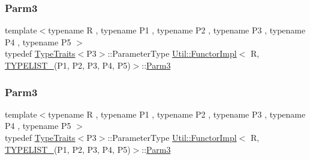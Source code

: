 \mbox{\label{classUtil_1_1FunctorImpl_3_01R_00_01TYPELIST__5_07P1_00_01P2_00_01P3_00_01P4_00_01P5_08_4_a5ad1ce88b66a6e09b4a462f27ebeb665}} 
\subsubsection{\texorpdfstring{Parm3}{Parm3}\hspace{0.1cm}{\footnotesize\ttfamily [1/3]}}
{\footnotesize\ttfamily template$<$typename R , typename P1 , typename P2 , typename P3 , typename P4 , typename P5 $>$ \\
typedef \mbox{\hyperlink{classUtil_1_1TypeTraits}{Type\+Traits}}$<$P3$>$\+::Parameter\+Type \mbox{\hyperlink{classUtil_1_1FunctorImpl}{Util\+::\+Functor\+Impl}}$<$ R, \mbox{\hyperlink{adat__devel__install_2include_2adat_2typelist_8h_aad5d9b3c82c8503c85c625acd41c0a2f}{T\+Y\+P\+E\+L\+I\+S\+T\+\_}}(P1, P2, P3, P4, P5)$>$\+::\mbox{\hyperlink{structUtil_1_1Private_1_1FunctorImplBase_a052148e627fd4caecbcffdbdf1033dbb}{Parm3}}}

\mbox{\label{classUtil_1_1FunctorImpl_3_01R_00_01TYPELIST__5_07P1_00_01P2_00_01P3_00_01P4_00_01P5_08_4_a5ad1ce88b66a6e09b4a462f27ebeb665}} 
\subsubsection{\texorpdfstring{Parm3}{Parm3}\hspace{0.1cm}{\footnotesize\ttfamily [2/3]}}
{\footnotesize\ttfamily template$<$typename R , typename P1 , typename P2 , typename P3 , typename P4 , typename P5 $>$ \\
typedef \mbox{\hyperlink{classUtil_1_1TypeTraits}{Type\+Traits}}$<$P3$>$\+::Parameter\+Type \mbox{\hyperlink{classUtil_1_1FunctorImpl}{Util\+::\+Functor\+Impl}}$<$ R, \mbox{\hyperlink{adat__devel__install_2include_2adat_2typelist_8h_aad5d9b3c82c8503c85c625acd41c0a2f}{T\+Y\+P\+E\+L\+I\+S\+T\+\_}}(P1, P2, P3, P4, P5)$>$\+::\mbox{\hyperlink{structUtil_1_1Private_1_1FunctorImplBase_a052148e627fd4caecbcffdbdf1033dbb}{Parm3}}}

